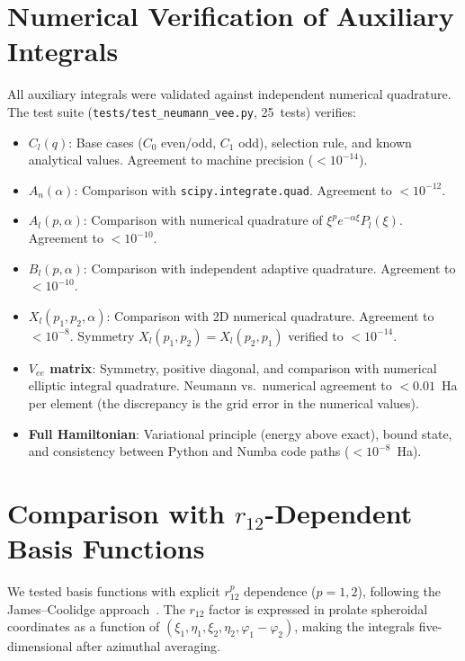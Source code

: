 \documentclass[aps,pra,twocolumn,superscriptaddress,longbibliography]{revtex4-2}
\begin{document}
\appendix

\section{Numerical Verification of Auxiliary Integrals}
\label{app:verification}

All auxiliary integrals were validated against independent
numerical quadrature.  The test suite (\texttt{tests/test\_neumann\_vee.py},
25~tests) verifies:

\begin{itemize}
  \item \textbf{$C_l(q)$}: Base cases ($C_0$ even/odd, $C_1$ odd),
    selection rule, and known analytical values.  Agreement to
    machine precision ($< 10^{-14}$).
  \item \textbf{$A_n(\alpha)$}: Comparison with \texttt{scipy.integrate.quad}.
    Agreement to $< 10^{-12}$.
  \item \textbf{$A_l(p, \alpha)$}: Comparison with numerical
    quadrature of $\xi^p e^{-\alpha\xi} P_l(\xi)$.
    Agreement to $< 10^{-10}$.
  \item \textbf{$B_l(p, \alpha)$}: Comparison with independent
    adaptive quadrature.  Agreement to $< 10^{-10}$.
  \item \textbf{$X_l(p_1, p_2, \alpha)$}: Comparison with 2D
    numerical quadrature.  Agreement to $< 10^{-8}$.
    Symmetry $X_l(p_1, p_2) = X_l(p_2, p_1)$ verified to
    $< 10^{-14}$.
  \item \textbf{$V_{ee}$ matrix}: Symmetry, positive diagonal,
    and comparison with numerical elliptic integral quadrature.
    Neumann vs.\ numerical agreement to $< 0.01$~Ha per element
    (the discrepancy is the grid error in the numerical values).
  \item \textbf{Full Hamiltonian}: Variational principle (energy
    above exact), bound state, and consistency between
    Python and Numba code paths ($< 10^{-8}$~Ha).
\end{itemize}

\section{Comparison with \texorpdfstring{$r_{12}$}{r12}-Dependent
Basis Functions}
\label{app:r12}

We tested basis functions with explicit $r_{12}^p$ dependence
($p = 1, 2$), following the James--Coolidge
approach~\cite{James1933}.  The $r_{12}$ factor is expressed in
prolate spheroidal coordinates as a function of $(\xi_1, \eta_1,
\xi_2, \eta_2, \varphi_1 - \varphi_2)$, making the integrals
five-dimensional after azimuthal averaging.
\end{document}
